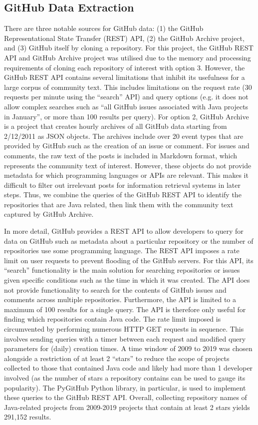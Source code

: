 \subsection{GitHub Data Extraction}
\label{subsec:info-github-extract}
There are three notable sources for GitHub data: (1) the GitHub Representational State Transfer (REST) API, (2) the GitHub Archive project, and (3) GitHub itself by cloning a repository. For this project, the GitHub REST API and GitHub Archive project was utilised due to the memory and processing requirements of cloning each repository of interest with option 3. However, the GitHub REST API contains several limitations that inhibit its usefulness for a large corpus of community text. This includes limitations on the request rate (30 requests per minute using the ``search'' API) and query options (e.g. it does not allow complex searches such as ``all GitHub issues associated with Java projects in January'', or more than 100 results per query). For option 2, GitHub Archive is a project that creates hourly archives of all GitHub data starting from 2/12/2011 as JSON objects. The archives include over 20 event types that are provided by GitHub such as the creation of an issue or comment. For issues and comments, the raw text of the posts is included in Markdown format, which represents the community text of interest.  However, these objects do not provide metadata for which programming languages or APIs are relevant. This makes it difficult to filter out irrelevant posts for information retrieval systems in later steps.
Thus, we combine the queries of the GitHub REST API to identify the repositories that are Java related, then link them with the community text captured by GitHub Archive.\bigbreak

In more detail, GitHub provides a REST API to allow developers to query for data on GitHub such as metadata about a particular repository or the number of repositories use some programming language. The REST API imposes a rate limit on user requests to prevent flooding of the GitHub servers. For this API, its  ``search'' functionality is the main solution for searching repositories or issues given specific conditions such as the time in which it was created. The API does not provide functionality to search for the contents of GitHub issues and comments across multiple repositories. Furthermore, the API is limited to a maximum of 100 results for a single query. The API is therefore only useful for finding which repositories contain Java code. The rate limit imposed is circumvented by performing numerous HTTP GET requests in sequence. This involves sending queries with a timer between each request and modified query parameters for (daily) creation times. A time window of 2009 to 2019 was chosen alongside a restriction of at least 2 ``stars'' to reduce the scope of projects collected to those that contained Java code and likely had more than 1 developer involved (as the number of stars a repository contains can be used to gauge its popularity). The PyGitHub Python library, in particular, is used to implement these queries to the GitHub REST API. Overall, collecting repository names of Java-related projects from 2009-2019 projects that contain at least 2 stars yields 291,152 results. \bigbreak

